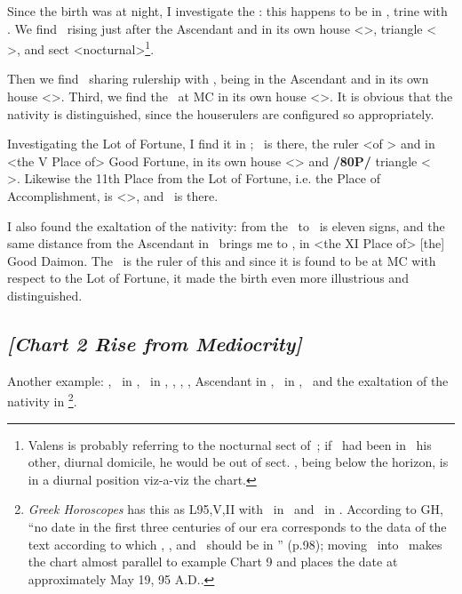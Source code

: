 Since the birth was at night, I investigate the \Moon: this
happens to be in \Cancer, trine with \Mars. We find \Mars\, rising just after the Ascendant and in its own
house <\Scorpio>, triangle <\Scorpio\,\Pisces\, \Cancer>, and sect <nocturnal>\footnote{Valens is probably referring to the nocturnal sect of \Scorpio\,; if \Mars\, had been in \Aries\, his other, diurnal domicile, he would be out of sect. \Mars, being below the horizon, is in a diurnal position viz-a-viz the chart.}. 

Then we find \Venus\, sharing rulership with \Mars, being in the Ascendant and in its own house <\Libra>. Third, we find the \Moon\, at MC in its own house <\Cancer>. It is obvious that the nativity is distinguished, since the houserulers are configured so appropriately. 

Investigating the Lot of Fortune, I find it in \Aquarius; \Saturn\, is there, the ruler <of \Aquarius> and in <the V Place of> Good Fortune, in its own house <\Aquarius> and \textbf{/80P/} triangle <\Aquarius\, \Libra\, \Gemini>. Likewise the 11th Place from the Lot of Fortune, i.e. the Place of Accomplishment, is <\Sagittarius>, and \Jupiter\, is there.

I also found the exaltation of the nativity: from the \Moon\, to \Taurus\, is eleven signs, and the same distance from the Ascendant in \Libra\, brings me to \Leo, in <the XI Place of> [the] Good Daimon. The \Sun\, is the ruler of this and since it is found to be at MC with respect to the Lot of Fortune, it made the birth even more illustrious and distinguished.
\newpage
\subsection*{\textit{[Chart 2 Rise from Mediocrity]}}

Another example: \Sun, \Mercury\, in \Taurus, \Moon\, in \Aries, \Saturn, \Mars, \Venus, Ascendant in \Cancer,
\Jupiter\, in \Capricorn, \Fortune\, and the exaltation of the nativity in \Gemini
\footnote{\textit{Greek Horoscopes} has this as L95,V,II with \Saturn\, in \Leo\, and \Jupiter\, in \Virgo. According to GH, ``no date in the first three centuries of our era corresponds to the data of the text according to which \Saturn, \Mars, and \Venus\, should be in \Cancer'' (p.98); moving \Saturn\, into \Leo\, makes the chart almost parallel to example Chart 9 and places the date at approximately May 19, 95 A.D..}.

